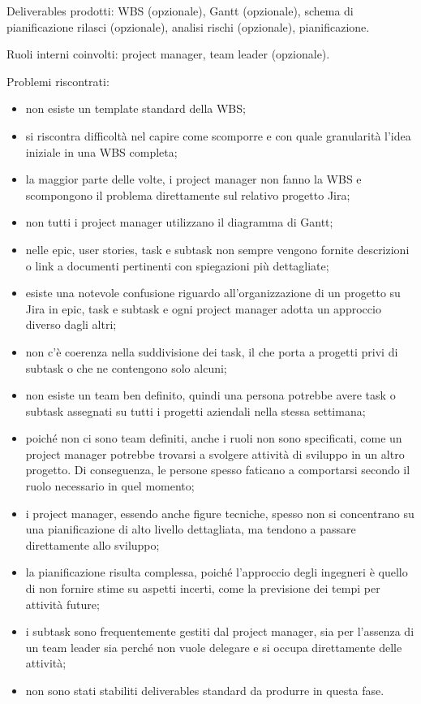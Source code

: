         Deliverables prodotti: \ac{WBS} (opzionale), Gantt (opzionale), schema di pianificazione rilasci (opzionale), analisi rischi (opzionale), pianificazione.

        Ruoli interni coinvolti: project manager, team leader (opzionale).

        Problemi riscontrati:
        \begin{itemize}
            \item non esiste un template standard della WBS;
            \item si riscontra difficoltà nel capire come scomporre e con quale granularità l’idea iniziale in una WBS completa;            
            \item la maggior parte delle volte, i project manager non fanno la WBS e scompongono il problema direttamente sul relativo progetto Jira;            
            \item non tutti i project manager utilizzano il diagramma di Gantt;            
            \item nelle epic, user stories, task e subtask non sempre vengono fornite descrizioni o link a documenti pertinenti con spiegazioni più dettagliate;            
            \item esiste una notevole confusione riguardo all'organizzazione di un progetto su Jira in epic, task e subtask e
            ogni project manager adotta un approccio diverso dagli altri;           
            \item non c'è coerenza nella suddivisione dei task, il che porta a progetti privi di subtask o che ne contengono solo alcuni;            
            \item non esiste un team ben definito, quindi una persona potrebbe avere task o subtask assegnati su tutti i progetti aziendali nella stessa settimana;            
            \item poiché non ci sono team definiti, anche i ruoli non sono specificati, come un project manager potrebbe trovarsi a svolgere attività di sviluppo in un altro progetto.
            Di conseguenza, le persone spesso faticano a comportarsi secondo il ruolo necessario in quel momento;
            \item i project manager, essendo anche figure tecniche, spesso non si concentrano su una pianificazione di alto livello
            dettagliata, ma tendono a passare direttamente allo sviluppo;            
            \item la pianificazione risulta complessa, poiché l’approccio degli ingegneri è quello di non fornire stime su aspetti incerti, come la previsione
            dei tempi per attività future;        
            \item i subtask sono frequentemente gestiti dal project manager, sia per l'assenza di un team leader sia perché non vuole
            delegare e si occupa direttamente delle attività;
            \item non sono stati stabiliti deliverables standard da produrre in questa fase.
        \end{itemize}

